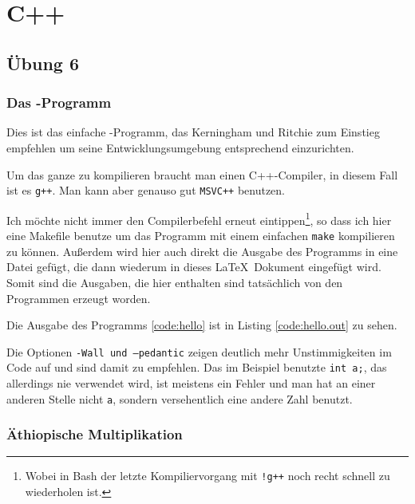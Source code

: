 
\part{C++}

\chapter{Übung 6}

\section{Das -Programm}

Dies ist das einfache -Programm, das Kerningham und Ritchie zum Einstieg empfehlen um seine Entwicklungsumgebung entsprechend einzurichten.


Um das ganze zu kompilieren braucht man einen C++-Compiler, in diesem Fall ist es \texttt{g++}. Man kann aber genauso gut \texttt{MSVC++} benutzen.

Ich möchte nicht immer den Compilerbefehl erneut eintippen\footnote{Wobei in Bash der letzte Kompiliervorgang mit \texttt{!g++} noch recht schnell zu wiederholen ist.}, so dass ich hier eine Makefile benutze um das Programm mit einem einfachen \texttt{make} kompilieren zu können. Außerdem wird hier auch direkt die Ausgabe des Programms in eine Datei gefügt, die dann wiederum in dieses \LaTeX\ Dokument eingefügt wird. Somit sind die Ausgaben, die hier enthalten sind tatsächlich von den Programmen erzeugt worden.


Die Ausgabe des Programms \ref{code:hello} ist in Listing \ref{code:hello.out} zu sehen.


Die Optionen \texttt{-Wall und --pedantic} zeigen deutlich mehr Unstimmigkeiten im Code auf und sind damit zu empfehlen. Das im Beispiel benutzte \texttt{int a;}, das allerdings nie verwendet wird, ist meistens ein Fehler und man hat an einer anderen Stelle nicht \texttt{a}, sondern versehentlich eine andere Zahl benutzt.

\section{Äthiopische Multiplikation}
\label{section:ethiopian}

